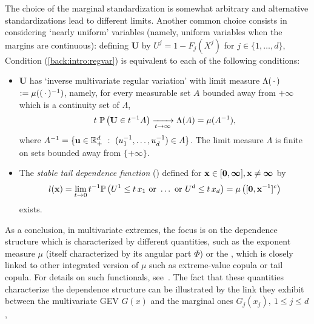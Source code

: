 The choice of the marginal standardization is somewhat arbitrary and alternative standardizations  lead
to different limits. Another common choice consists in considering `nearly
uniform' 
variables (namely, uniform variables when the margins are continuous): defining $\mathbf{U}$ by $U^j =1-F_j(X^j)$ for
$j\in\{1,\ldots,d\}$,   %
Condition (\ref{back:intro:regvar}) is equivalent to each of the  following conditions:
\begin{itemize}
\item $\mathbf{U}$ has  `inverse multivariate regular variation' %
  with limit measure $\Lambda(\,\cdot\,)$ $:=\mu((\,\cdot\,)^{-1})$, namely,
  for every measurable set $A$ bounded away from $+\boldsymbol{\infty}$ which is a
  continuity set of $\Lambda$,
\begin{align}
\label{back:reg_var_U}
t~ \mathbb{P}\left( \mathbf U \in t^{-1} A\right)
\xrightarrow[t\to\infty]{} \Lambda(A) = \mu(A^{-1}), 
\end{align}
where $A^{-1} = \{\mathbf u \in \mathbb{R}^{d}_+ ~:~(u_1^{-1},\ldots,u_d^{-1})
\in A\}$. The limit measure $\Lambda$ is finite on sets bounded away from $\{+\boldsymbol{\infty}\}$. 
\item The \textit{stable tail dependence function} (\stdf) defined for $\mathbf x\in[\mathbf 0,\boldsymbol{\infty}], \mathbf x\neq\boldsymbol{\infty}$ by 
\begin{align}
\label{back:stdf1}
l(\mathbf x) = \lim_{t \to 0} t^{-1} \mathbb{P} \left( U^1 \le t\, x_1 ~\text{or}~ \ldots ~\text{or}~ U^d \le t\,x_d  \right)
 = \mu\left([\mathbf 0, \mathbf{x}^{-1}]^c\right) 
\end{align}
exists. 
\end{itemize}

As a conclusion, in multivariate extremes, the focus is on the dependence structure which is characterized by different quantities, such as the exponent measure $\mu$ (itself characterized by its angular part $\Phi$) or the \stdf, which is closely linked to other integrated version of $\mu$ such as extreme-value copula or tail copula. For details on such functionals, see~\cite{Segers12}.
The fact that these quantities characterize the dependence structure can be illustrated by the link they exhibit between the multivariate GEV $G(x)$ and the marginal ones $G_j(x_j),~1 \le j \le d$,

